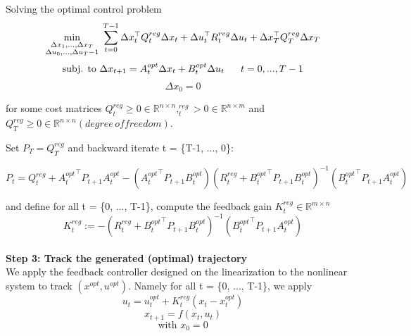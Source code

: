 \documentclass[a4paper,11pt,oneside]{book}
\begin{document}
 Solving the optimal control problem
\begin{equation*}
\min_{\substack{{\Delta x_1,...,\Delta x_T}\\{\Delta u_0,...,\Delta u_T-1}}} \;  \sum\limits_{t=0}^{T-1}\Delta x_t^\top Q^{reg}_{t}\Delta x_t + \Delta u_t^\top R^{reg}_{t}\Delta u_t + \Delta x_T^\top Q^{reg}_{T}\Delta x_T\\
\end{equation*}
\begin{equation*}
\textrm{subj. to }\Delta x_{t+1}=A_t^{opt}\Delta x_t+B_t^{opt}\Delta u_t\;\;\;\;\;\;t=0,...,T-1\\
\end{equation*}
\begin{equation*}
\Delta x_{0} = 0
\end{equation*}

for some cost matrices $Q^{reg}_{t} \geq 0 \in \mathbb{R}^{n \times n}, ^{reg}_{t}> 0 \in \mathbb{R}^{n \times m}$ and $Q^{reg}_{T} \geq 0 \in \mathbb{R}^{n \times n} (degree \, of freedom).$ 

Set $P_T = Q^{reg}_{T}$ and backward iterate t = \{T-1, ..., 0\}:

\begin{equation*}
P_t=Q^{reg}_{t}+{A_t^{opt}}^\top P_{t+1}A_t^{opt} - ({A_t^{opt}}^\top P_{t+1}B_t^{opt})(R^{reg}_{t}+{B_t^{opt}}^\top P_{t+1}B_t^{opt})^{-1}({B_t^{opt}}^\top P_{t+1}A_t^{opt})
\end{equation*}

and define for all t = \{0, ..., T-1\}, compute the feedback gain $K^{reg}_{t} \in \mathbb{R}^{m \times n}$
\begin{equation*}
K^{reg}_{t}:= -(R^{reg}_{t} + {B_t^{opt}}^\top P_{t+1}B_t^{opt})^{-1}({B_t^{opt}}^\top P_{t+1}A_t^{opt})
\end{equation*}
\\
\textbf{Step 3: Track the generated (optimal) trajectory }\\

We apply the feedback controller designed on the linearization to the nonlinear system to track $(x^{opt},u^{opt})$. Namely for all t = \{0, ..., T-1\}, we apply 
\begin{equation*}
u_t=u_t^{opt}+K^{reg}_{t}(x_t - x_t^{opt})
\end{equation*}
\begin{equation*}
x_{t+1} = f(x_t,u_t)
\end{equation*}
\begin{equation*}
\textrm{with } x_0 = 0
\end{equation*}
\end{document}
